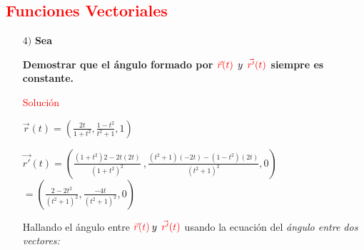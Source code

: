 \documentclass[12pt, letter-paper]{article}
\begin{document}
\newpage
\Large{\textcolor{red}{\section{Funciones Vectoriales}}}
\vspace{0.7cm}
\begin{enumerate}
    
    \item [$4)$]
    \normalsize{\textbf{Sea}} \par
    \Large{\par}
    \vspace{0.5cm}    
    \normalsize{\textbf{Demostrar que el ángulo formado por $\textcolor{red}{\vec{r}(t)\:\:}  y \:\:   \textcolor{red}{\vec{r'}(t)}$ siempre es constante.}}\par
    \vspace{0.5cm}
    \large{\textcolor{red}{Solución}\par}
    \vspace{0.5cm}
    \large{$\vec{r}(t)=\left ( \frac{2t}{1+t^{2}},\frac{1-t^{2}}{t^{2}+1},1 \right )$}\par
    \vspace{0.5cm}
    \large{$\vec{r'}(t)=\left ( \frac{(1+t^{2})2-2t(2t)}{\left({1+t^{2}}\right)^{2}}\:,\frac{(t^{2}+1)(-2t)-(1-t^{2})(2t)}{\left({t^{2}+1}\right)^{2}},0 \right )$}
    \large{$=\left ( \frac{2-2t^{2}}{\left({t^{2}+1}\right)^{2}},\frac{-4t}{\left({t^{2}+1}\right)^{2}},0 \right )$}\par
    \vspace{0.5cm}
    \normalsize{Hallando el ángulo entre $\textcolor{Red}{\vec{r}(t)\:} y \:\: \textcolor{red}{\vec{r'}(t)}$\: usando la ecuación del \textit{ángulo entre dos vectores:}\par}
    \vspace{0.5cm}
    

\end{enumerate}
\end{document}
